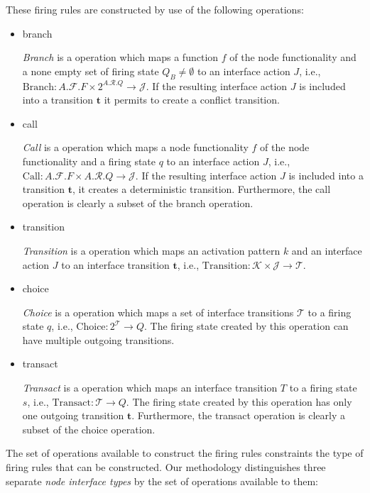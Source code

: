 These firing rules are constructed by use of the following operations:

\begin{itemize}
\item branch

\emph{Branch} is a operation which maps a function $f$ of the node functionality and
a none empty set of firing state $Q_B \ne \emptyset$ to an interface action $J$,
i.e., $\textrm{Branch}: A.\mathcal{F}.F \times 2^{A.\mathcal{R}.Q} \to \mathcal{J}$.
If the resulting interface action $J$ is included into a transition
$\mathbf{t}$ it permits to create a conflict transition.

\item call

\emph{Call} is a operation which maps a node functionality $f$ of the node functionality and
a firing state $q$ to an interface action $J$,
i.e., $\textrm{Call}: A.\mathcal{F}.F \times A.\mathcal{R}.Q \to \mathcal{J}$.
If the resulting interface action $J$ is included into a
transition $\mathbf{t}$, it creates a deterministic transition.
Furthermore, the call operation is clearly a subset of the
branch operation.

\item transition

\emph{Transition} is a operation which maps an activation pattern $k$ and
an interface action $J$ to an interface transition $\mathbf{t}$,
i.e., $\textrm{Transition}: \mathcal{K} \times \mathcal{J} \to \mathcal{T}$.

\item choice

\emph{Choice} is a operation which maps a set of interface transitions $\mathcal{T}$
to a firing state $q$,
i.e., $\textrm{Choice}: 2^{\mathcal{T}} \to Q$.
The firing state created by this operation can have multiple outgoing
transitions.

\item transact

\emph{Transact} is a operation which maps an interface transition $T$
to a firing state $s$,
i.e., $\textrm{Transact}: \mathcal{T} \to Q$.
The firing state created by this operation has only one outgoing
transition $\mathbf{t}$.
Furthermore, the transact operation is clearly a subset of the
choice operation.

\end{itemize}

The set of operations available to construct the firing rules constraints
the type of firing rules that can be constructed.
Our methodology distinguishes three separate \emph{node interface types}
by the set of operations available to them:

